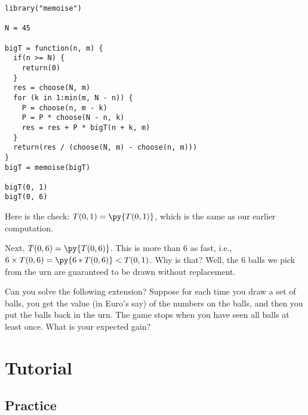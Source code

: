 \begin{exercise}
\begin{solution}
\begin{pyblock}
\end{pyblock}
\begin{verbatim}
library("memoise")

N = 45

bigT = function(n, m) {
  if(n >= N) {
    return(0)
  }
  res = choose(N, m)
  for (k in 1:min(m, N - n)) {
    P = choose(n, m - k)
    P = P * choose(N - n, k)
    res = res + P * bigT(n + k, m)
  }
  return(res / (choose(N, m) - choose(n, m)))
}
bigT = memoise(bigT)

bigT(0, 1)
bigT(0, 6)
\end{verbatim}
Here is the check: $T(0, 1) = \py{T(0, 1)}$, which is the same as our earlier computation.

Next, $T(0, 6) = \py{T(0,6)}$.
This is more than $6$ as fast, i.e., $6\times T(0, 6) = \py{6*T(0, 6)} < T(0,1)$.
Why is that?
Well, the 6 balls we pick from the urn are guaranteed to be drawn without replacement.


Can you solve the following extension? Suppose for each time you draw a set of balls, you get the value (in Euro's say) of the numbers on the balls, and then you put the balls back in the urn.
The game stops when you have seen all balls at least once. What is your expected gain?

\end{solution}
\end{exercise}



\section{Tutorial}
\label{sec:tutorial}


\subsection{Practice}

